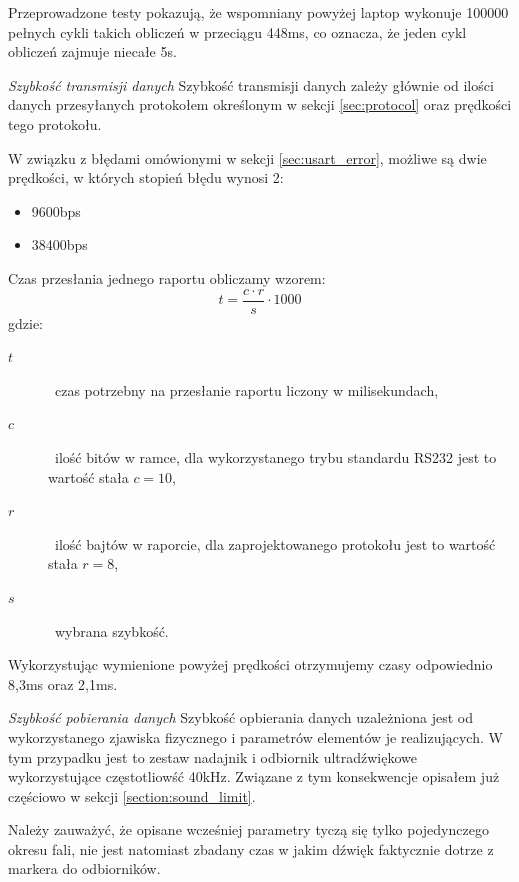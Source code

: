 Przeprowadzone testy pokazują, że wspomniany powyżej laptop wykonuje 100000 pełnych cykli takich obliczeń w przeciągu 448ms, co oznacza, że jeden cykl obliczeń zajmuje niecałe 5\textmu s.


\textsl{Szybkość transmisji danych}
Szybkość transmisji danych zależy głównie od ilości danych przesyłanych protokołem określonym w sekcji \ref{sec:protocol} oraz prędkości tego protokołu.

W związku z błędami omówionymi w sekcji \ref{sec:usart_error}, możliwe są dwie prędkości, w których stopień błędu wynosi 2\textperthousand:
\begin{itemize}
 \item 9600bps
 \item 38400bps
\end{itemize}

Czas przesłania jednego raportu obliczamy wzorem:
\begin{equation}
 t = \frac{c \cdot r}{s} \cdot 1000
\end{equation}
gdzie:
\begin{description}
 \item[$t$] \ppauza~czas potrzebny na przesłanie raportu liczony w milisekundach,
 \item[$c$] \ppauza~ilość bitów w ramce, dla wykorzystanego trybu standardu RS232 jest to wartość stała $c = 10$,
 \item[$r$] \ppauza~ilość bajtów w raporcie, dla zaprojektowanego protokołu jest to wartość stała $r = 8$,
 \item[$s$] \ppauza~wybrana szybkość.
\end{description}

Wykorzystując wymienione powyżej prędkości otrzymujemy czasy odpowiednio 8,3ms oraz 2,1ms.

\textsl{Szybkość pobierania danych}
Szybkość opbierania danych uzależniona jest od wykorzystanego zjawiska fizycznego i parametrów elementów je realizujących. W tym przypadku jest to zestaw nadajnik i odbiornik ultradźwiękowe wykorzystujące częstotliowść 40kHz. Związane z tym konsekwencje opisałem już częściowo w sekcji \ref{section:sound_limit}.

Należy zauważyć, że opisane wcześniej parametry tyczą się tylko pojedynczego okresu fali, nie jest natomiast zbadany czas w jakim dźwięk faktycznie dotrze z markera do odbiorników.

